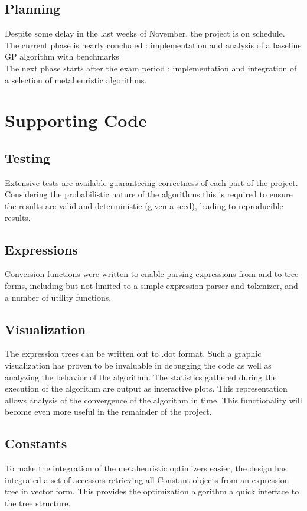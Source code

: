 \documentclass[10pt]{extarticle}
\begin{document}
\subsection{Planning}
Despite some delay in the last weeks of November, the project is on schedule.\\
The current phase is nearly concluded : implementation and analysis of a baseline GP algorithm with benchmarks\\
The next phase starts after the exam period : implementation and integration of a selection of metaheuristic algorithms.
\section{Supporting Code}
\subsection{Testing}
Extensive tests are available guaranteeing correctness of each part of the project. 
Considering the probabilistic nature of the algorithms this is required to ensure the results are valid and deterministic (given a seed),
leading to reproducible results.
\subsection{Expressions}
Conversion functions were written to enable parsing expressions from and to tree forms, including but not limited to a simple expression parser and tokenizer, and a number of utility functions.
\subsection{Visualization}
The expression trees can be written out to .dot format. Such a graphic visualization has proven to be invaluable in debugging the code as well as analyzing the behavior of the algorithm. The statistics gathered during the execution of the algorithm are output as interactive plots. This representation allows analysis of the convergence of the algorithm in time. This functionality will become even more useful in the remainder of the project.
\subsection{Constants}
To make the integration of the metaheuristic optimizers easier, the design has integrated a set of accessors retrieving all Constant objects from an expression tree in vector form. This provides the optimization algorithm a quick interface to the tree structure.

\end{document}
